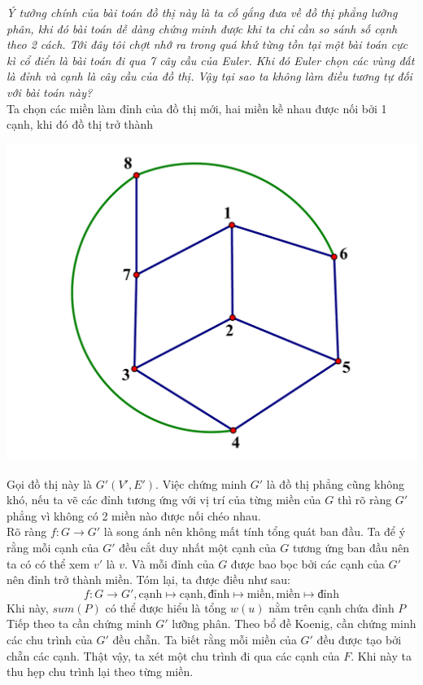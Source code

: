 \documentclass[11pt]{scrartcl}
\begin{document}
\begin{itemize}[label=, leftmargin=0em, itemsep=0.5em]
\begin{sol}
        \textbf{}\textit{Ý tưởng chính của bài toán đồ thị này là ta cố gắng đưa về đồ thị phẳng lưỡng phân, khi đó bài toán dễ dàng chứng minh được khi ta chỉ cần so sánh số cạnh theo 2 cách. Tới đây tôi chợt nhớ ra trong quá khứ từng tồn tại một bài toán cực kì cổ điển là bài toán đi qua 7 cây cầu của Euler. Khi đó Euler chọn các vùng đất là đỉnh và cạnh là cây cầu của đồ thị. Vậy tại sao ta không làm điều tương tự đối với bài toán này?}\\
        Ta chọn các miền làm đỉnh của đồ thị mới, hai miền kề nhau được nối bởi 1 cạnh, khi đó đồ thị trở thành
        \begin{center}
            \includegraphics[scale=0.22]{Image/8.pdf}
        \end{center}
        Gọi đồ thị này là $G'(V',E')$. Việc chứng minh $G'$ là đồ thị phẳng cũng không khó, nếu ta vẽ các đỉnh tương ứng với vị trí của từng miền của $G$ thì rõ ràng $G'$ phẳng vì không có 2 miền nào được nối chéo nhau.\\
        Rõ ràng $f: G \to G'$ là song ánh nên không mất tính tổng quát ban đầu. Ta để ý rằng mỗi cạnh của $G'$ đều cắt duy nhất một cạnh của $G$ tương ứng ban đầu nên ta có có thể xem $v'$ là $v$. Và mỗi đỉnh của $G$ được bao bọc bởi các cạnh của $G'$ nên đỉnh trở thành miền. Tóm lại, ta được điều như sau:
        $$ f: G \to G', \text{cạnh} \mapsto \text{cạnh}, \text{đỉnh} \mapsto \text{miền}, \text{miền} \mapsto \text{đỉnh}
        $$
        Khi này,  $sum(P)$ có thể được hiểu là tổng $w(u)$ nằm trên cạnh chứa đỉnh $P$\\
        Tiếp theo ta cần chứng minh $G'$ lưỡng phân. Theo bổ đề Koenig, cần chứng minh các chu trình của $G'$ đều chẵn. Ta biết rằng mỗi miền của $G'$ đều được tạo bởi chẵn các cạnh. Thật vậy, ta xét một chu trình đi qua các cạnh của $F$. Khi này ta thu hẹp chu trình lại theo từng miền.\\

\end{sol}
\end{itemize}
\end{document}
